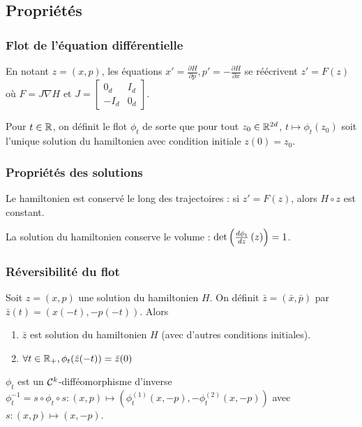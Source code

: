 \documentclass[10pt]{beamer}
\begin{document}
\subsection{Propriétés}

\begin{frame}
	\frametitle{Flot de l'équation différentielle}
	En notant $z = (x,p)$, les équations $x' = \frac{\partial H}{\partial p}, p' = -\frac{\partial H}{\partial x}$ se réécrivent $z' = F(z)$ où $F = J \nabla H$ et
	$J = \begin{bmatrix}
		0_{d} & I_{d} \\
		-I_{d} & 0_{d}
              \end{bmatrix}$.
              \begin{Def}
		Pour $t \in \mathbb{R}$, on définit le flot $\phi_t$ de sorte que pour tout $z_0 \in \mathbb{R}^{2d}$, $t \mapsto \phi_t(z_0)$ soit l'unique solution du hamiltonien avec condition initiale $z(0) = z_0$.
              \end{Def}
\end{frame}
\begin{frame}            
  \frametitle{Propriétés des solutions}
  	\begin{Prop}
		Le hamiltonien est conservé le long des trajectoires : si $z' = F(z)$, alors $H \circ z$ est constant.
	\end{Prop}
	
	\begin{Prop}
		La solution du hamiltonien conserve le volume : $\det \left( \frac{d \phi_t}{d z} \left( z \right) \right) = 1$.
	\end{Prop}
\end{frame}

\begin{frame}
	\frametitle{Réversibilité du flot}
	\begin{Lem}
		Soit $z = (x,p)$ une solution du hamiltonien $H$. On définit $\bar{z} = (\bar x, \bar p)$ par $\bar z(t) = (x(-t), -p(-t))$. Alors
		\begin{enumerate}
			\item $\bar{z}$ est solution du hamiltonien $H$ (avec d'autres conditions initiales).
			\item $\forall t \in \mathbb{R}_+, \phi_t(\bar{z}(-t)) = \bar{z}(0)$
		\end{enumerate}
	\end{Lem}
	\begin{Prop}
		$\phi_t$ est un $\mathcal{C}^k$-difféomorphisme d'inverse $\phi_t^{-1}  = s \circ \phi_t \circ s : (x,p) \mapsto (\phi_t^{(1)}(x, -p), - \phi_t^{(2)}(x, -p))$ avec $s : (x,p) \mapsto (x,-p)$. 
	\end{Prop}
\end{frame}
\end{document}
